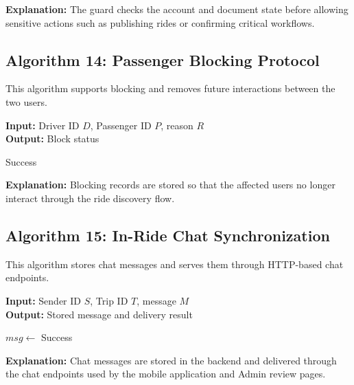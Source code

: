 \textbf{Explanation:} The guard checks the account and document state before allowing sensitive actions such as publishing rides or confirming critical workflows.

\subsection{Algorithm 14: Passenger Blocking Protocol}

This algorithm supports blocking and removes future interactions between the two users.

\begin{breakablealgorithm}
\caption{Passenger Blocking}
\textbf{Input:} Driver ID $D$, Passenger ID $P$, reason $R$ \\
\textbf{Output:} Block status
\begin{algorithmic}[1]
    \State {}
    \State {}
    \State {}
    \State \Return Success
\EndFunction
\end{algorithmic}
\end{breakablealgorithm}

\textbf{Explanation:} Blocking records are stored so that the affected users no longer interact through the ride discovery flow.

\subsection{Algorithm 15: In-Ride Chat Synchronization}

This algorithm stores chat messages and serves them through HTTP-based chat endpoints.

\begin{breakablealgorithm}
\caption{Chat Storage and Delivery}
\textbf{Input:} Sender ID $S$, Trip ID $T$, message $M$ \\
\textbf{Output:} Stored message and delivery result
\begin{algorithmic}[1]
    \State $msg \gets$ 
    \State {}
    \State \Return Success
\EndFunction
\end{algorithmic}
\end{breakablealgorithm}

\textbf{Explanation:} Chat messages are stored in the backend and delivered through the chat endpoints used by the mobile application and Admin review pages.

